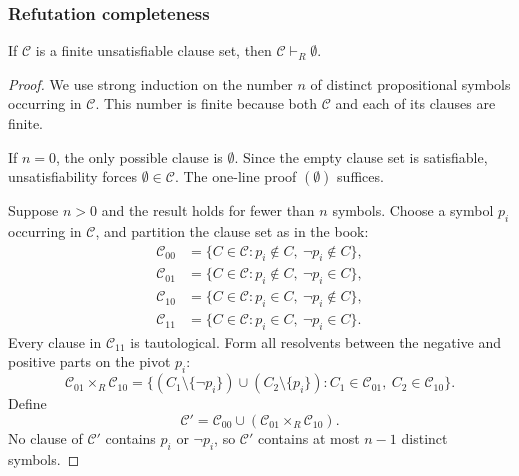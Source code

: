 \documentclass[11pt,a4paper]{amsart}
\begin{document}
\subsubsection{Refutation completeness}

\begin{theorem}
  If \(\mathcal C\) is a finite unsatisfiable clause set, then
  \(\mathcal C\vdash_R\emptyset\).
\end{theorem}

\begin{proof}
  We use strong induction on the number \(n\) of distinct propositional
  symbols occurring in \(\mathcal C\). This number is finite because both
  \(\mathcal C\) and each of its clauses are finite.

  If \(n=0\), the only possible clause is \(\emptyset\).
  Since the empty clause set is satisfiable, unsatisfiability forces
  \(\emptyset\in\mathcal C\). The one-line proof \((\emptyset)\) suffices.

  Suppose \(n>0\) and the result holds for fewer than \(n\) symbols.
  Choose a symbol \(p_i\) occurring in \(\mathcal C\), and partition the
  clause set as in the book:
  \[
    \begin{aligned}
      \mathcal C_{00}&=\{C\in\mathcal C:p_i\notin C,\ \neg p_i\notin C\},\\
      \mathcal C_{01}&=\{C\in\mathcal C:p_i\notin C,\ \neg p_i\in C\},\\
      \mathcal C_{10}&=\{C\in\mathcal C:p_i\in C,\ \neg p_i\notin C\},\\
      \mathcal C_{11}&=\{C\in\mathcal C:p_i\in C,\ \neg p_i\in C\}.
    \end{aligned}
  \]
  Every clause in \(\mathcal C_{11}\) is tautological. Form all resolvents
  between the negative and positive parts on the pivot \(p_i\):
  \[
    \mathcal C_{01}\times_R\mathcal C_{10}
    =\bigl\{(C_1\setminus\{\neg p_i\})\cup(C_2\setminus\{p_i\}):
    C_1\in\mathcal C_{01},\ C_2\in\mathcal C_{10}\bigr\}.
  \]
  Define
  \[
    \mathcal C'=\mathcal C_{00}\cup
    (\mathcal C_{01}\times_R\mathcal C_{10}).
  \]
  No clause of \(\mathcal C'\) contains \(p_i\) or \(\neg p_i\), so
  \(\mathcal C'\) contains at most \(n-1\) distinct symbols.


\end{proof}
\end{document}
